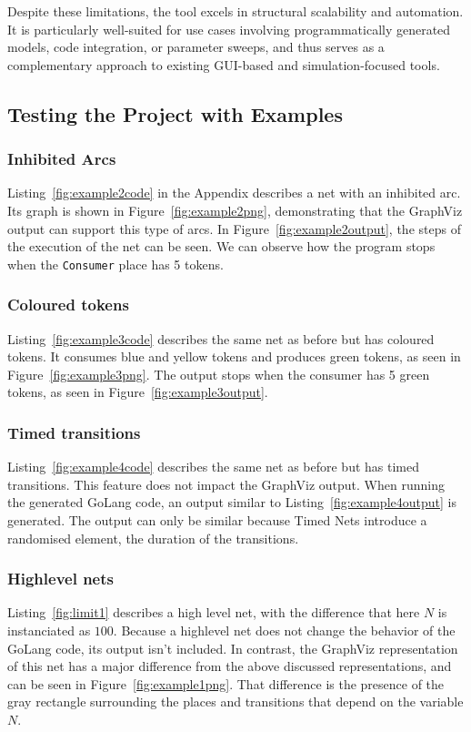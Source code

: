 \documentclass[12pt]{article}
\begin{document}
            Despite these limitations, the tool excels in structural scalability and automation. It is particularly well-suited for use cases involving programmatically generated models, code integration, or parameter sweeps, and thus serves as a complementary approach to existing GUI-based and simulation-focused tools.
    \subsection{Testing the Project with Examples}
        \subsubsection{Inhibited Arcs}
            Listing~\ref{fig:example2code} in the Appendix describes a net with an inhibited arc. Its graph is shown in Figure~\ref{fig:example2png}, demonstrating that the GraphViz output can support this type of arcs. In Figure~\ref{fig:example2output}, the steps of the execution of the net can be seen. We can observe how the program stops when the \texttt{Consumer} place has 5 tokens. 
        \subsubsection{Coloured tokens}
            Listing~\ref{fig:example3code} describes the same net as before but has coloured tokens. It consumes blue and yellow tokens and produces green tokens, as seen in Figure~\ref{fig:example3png}. The output stops when the consumer has 5 green tokens, as seen in Figure~\ref{fig:example3output}.
        \subsubsection{Timed transitions}
            Listing~\ref{fig:example4code} describes the same net as before but has timed transitions. This feature does not impact the GraphViz output. When running the generated GoLang code, an output similar to Listing~\ref{fig:example4output} is generated. The output can only be similar because Timed Nets introduce a randomised element, the duration of the transitions. 
        \subsubsection{Highlevel nets}
            Listing~\ref{fig:limit1} describes a high level net, with the difference that here $N$ is instanciated as $100$. Because a highlevel net does not change the behavior of the GoLang code, its output isn't included. In contrast, the GraphViz representation of this net has a major difference from the above discussed representations, and can be seen in Figure~\ref{fig:example1png}. That difference is the presence of the gray rectangle surrounding the places and transitions that depend on the variable $N$.  
\end{document}
